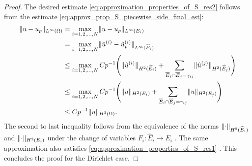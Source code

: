 \documentclass[english, 12pt, a4paper, sci, utf8, a-2b, online]{aaltothesis}
\theoremstyle{definition}
\theoremstyle{plain}
\DeclarePairedDelimiter\norm{\lVert}{\rVert}
\numberwithin{equation}{section}
\begin{document}
\begin{proof}
    The desired estimate \eqref{eq:approximation_properties_of_S_res2}
    follows from the estimate \eqref{eq:approx_prop_S_piecewise_side_final_est}:
    \begin{align}
        \norm{u - u_p}_{L^{\infty}(\Omega)}
        &= \max_{i=1,2,\dotsc,N} \norm{u - u_p}_{L^{\infty}(E_i)} \nonumber \\
        &= \max_{i=1,2,\dotsc,N}
            \norm{\hat{u}^{(i)} - \hat{u}_p^{(i)}}_{L^{\infty}(\widehat{E}_i)} \nonumber \\
        &\leq \max_{i=1,2,\dotsc,N} C p^{-1} \Bigg( \norm{\hat{u}^{(i)}}_{H^2(\widehat{E}_i)} +
            \sum_{\overline{E}_i \cap \overline{E}_j = \gamma_{ij}}
            \norm{\hat{u}^{(j)}}_{H^2(\widehat{E}_j)} \Bigg) \nonumber \\
        &\leq \max_{i=1,2,\dotsc,N} C p^{-1} \Bigg( \norm{u}_{H^2(E_i)} +
            \sum_{\overline{E}_i \cap \overline{E}_j = \gamma_{ij}}
            \norm{u}_{H^2(E_j)} \Bigg) \nonumber \\
        \label{eq:approx_prop_S_pointwise_final}
        &\leq C p^{-1} \norm{u}_{H^2(\Omega)}.
    \end{align}
    The second to last inequality follows from the equivalence of the norms
    $\norm{\cdot}_{H^2(\widehat{E}_i)}$ and $\norm{\cdot}_{H^2(E_i)}$
    under the change of variables $F_i: \widehat{E}_i \to E_i$ \cite[Theorem 1 on p.~13]{mazya2011}.
    The same approximation also satisfies \eqref{eq:approximation_properties_of_S_res1}
    \cite{babuskasuri1987}.
    This concludes the proof for the Dirichlet case.


\end{proof}
\end{document}
